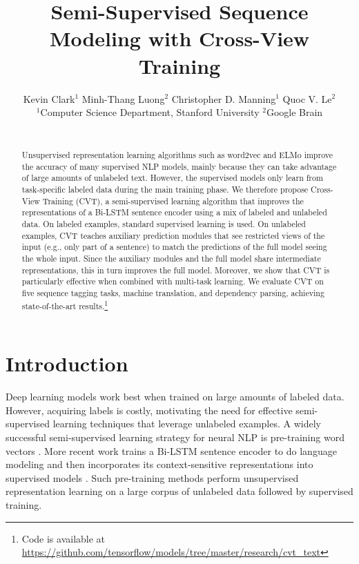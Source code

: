 \documentclass[11pt,a4paper]{article}
\title{Semi-Supervised Sequence Modeling with Cross-View Training}
\author{Kevin Clark$^1$ \hspace{3mm} Minh-Thang Luong$^2$ \hspace{3mm} Christopher D. Manning$^1$ \hspace{3mm} Quoc V. Le$^2$\\
   $^1$Computer Science Department, Stanford University \hspace{6mm} $^2$Google Brain \\
   \resizebox{0.99\textwidth}{!}{\tt kevclark@cs.stanford.edu, thangluong@google.com, manning@cs.stanford.edu, qvl@google.com} \\
 }
\date{}
\begin{document}
\maketitle


\begin{abstract}
Unsupervised representation learning algorithms such as word2vec and ELMo improve the accuracy of many supervised NLP models, mainly because they can take advantage of large amounts of unlabeled text.
However, the supervised models only learn from task-specific labeled data during the main training phase.
We therefore propose Cross-View Training (CVT), a semi-supervised learning algorithm that improves the representations of a Bi-LSTM sentence encoder using a mix of labeled and unlabeled data.
On labeled examples, standard supervised learning is used.
On unlabeled examples, CVT teaches auxiliary prediction modules that see restricted views of the input (e.g., only part of a sentence) to match the predictions of the full model seeing the whole input.
Since the auxiliary modules and the full model share intermediate representations, this in turn improves the full model. 
Moreover, we show that CVT is particularly effective when combined with multi-task learning.
We evaluate CVT on five sequence tagging tasks, machine translation, and dependency parsing, achieving state-of-the-art results.\footnote{Code is available at \url{https://github.com/tensorflow/models/tree/master/research/cvt_text}}
\end{abstract}


\section{Introduction}

Deep learning models work best when trained on large amounts of labeled data.
However, acquiring labels is costly, motivating the need for effective semi-supervised learning techniques that leverage unlabeled examples.
A widely successful semi-supervised learning strategy for neural NLP is pre-training word vectors \citep{Mikolov2013DistributedRO}.
More recent work trains a Bi-LSTM sentence encoder to do language modeling and then incorporates its context-sensitive 
representations into supervised models \citep{dai2015semi,peters2018deep}. 
Such pre-training methods perform unsupervised representation learning on a large corpus of unlabeled data followed by supervised training.
\end{document}

